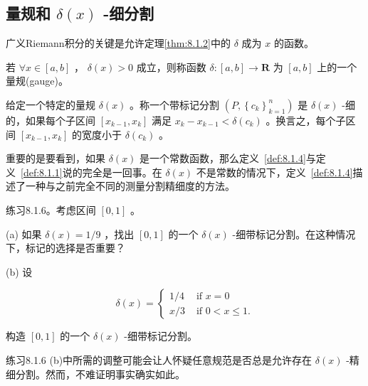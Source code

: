 \subsection{量规和 \(\delta \left( x\right)\) -细分割}

广义Riemann积分的关键是允许定理\ref{thm:8.1.2}中的 \(\delta\) 成为 \(x\) 的函数。

\begin{Def}
  \label{def:8.1.3}
   若 \(\forall x \in  \left\lbrack  {a,b}\right\rbrack\) ， \(\delta \left( x\right)  > 0\) 成立，则称函数 \(\delta  : \left\lbrack  {a,b}\right\rbrack   \rightarrow  \mathbf{R}\) 为 \(\left\lbrack  {a,b}\right\rbrack\) 上的一个量规(gauge)。
\end{Def}

\begin{Def}
  \label{def:8.1.4}
  给定一个特定的量规 \(\delta \left( x\right)\) 。称一个带标记分割 \(\left( {P,{\left\{  {c}_{k}\right\}  }_{k = 1}^{n}}\right)\) 是 \(\delta \left( x\right)\) -细的，如果每个子区间 \(\left\lbrack  {{x}_{k - 1},{x}_{k}}\right\rbrack\) 满足 \({x}_{k} - {x}_{k - 1} < \delta \left( {c}_{k}\right)\) 。换言之，每个子区间 \(\left\lbrack  {{x}_{k - 1},{x}_{k}}\right\rbrack\) 的宽度小于 \(\delta \left( {c}_{k}\right)\) 。
\end{Def}


重要的是要看到，如果 \(\delta \left( x\right)\) 是一个常数函数，那么定义~\ref{def:8.1.4}与定义~\ref{def:8.1.1}说的完全是一回事。在 \(\delta \left( x\right)\) 不是常数的情况下，定义~\ref{def:8.1.4}描述了一种与之前完全不同的测量分割精细度的方法。

练习8.1.6。考虑区间 \(\left\lbrack  {0,1}\right\rbrack\) 。

(a) 如果 \(\delta \left( x\right)  = 1/9\) ，找出 \(\left\lbrack  {0,1}\right\rbrack\) 的一个 \(\delta \left( x\right)\) -细带标记分割。在这种情况下，标记的选择是否重要？

(b) 设

\[
\delta \left( x\right)  = \left\{  \begin{array}{ll} 1/4 & \text{ if }x = 0 \\  x/3 & \text{ if }0 < x \leq  1. \end{array}\right.
\]

构造 \(\left\lbrack  {0,1}\right\rbrack\) 的一个 \(\delta \left( x\right)\) -细带标记分割。

练习8.1.6 (b)中所需的调整可能会让人怀疑任意规范是否总是允许存在 \(\delta \left( x\right)\) -精细分割。然而，不难证明事实确实如此。

